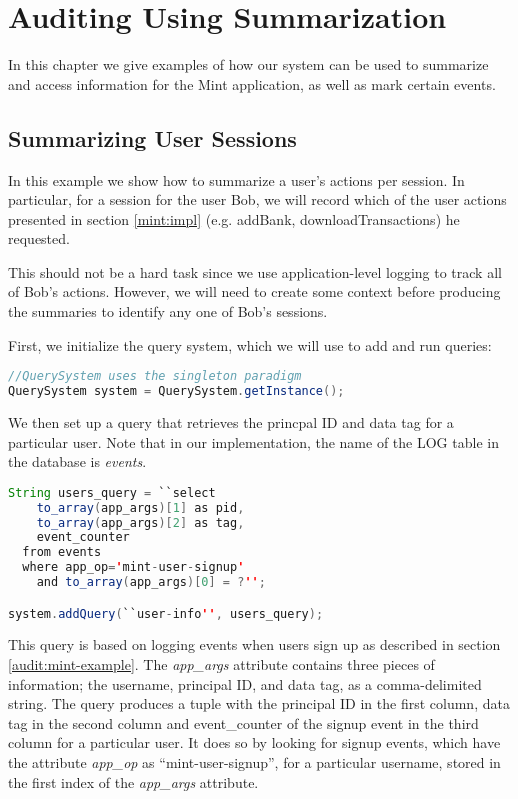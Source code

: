 \chapter{Auditing Using Summarization}

In this chapter we give examples of how our system can be used to summarize and access information for the Mint application, as well as mark certain events.

\section{Summarizing User Sessions}
\label{sum:sessions}
In this example we show how to summarize a user's actions per session. In particular, for a session for the user Bob, we will record which of the user actions presented in section \ref{mint:impl} (e.g. addBank, downloadTransactions) he requested.

This should not be a hard task since we use application-level logging to track all of Bob's actions. However, we will need to create some context before producing the summaries to identify any one of Bob's sessions.

First, we initialize the query system, which we will use to add and run queries:

\begin{lstlisting}[language=Java]
//QuerySystem uses the singleton paradigm
QuerySystem system = QuerySystem.getInstance();
\end{lstlisting}

We then set up a query that retrieves the princpal ID and data tag for a particular user. Note that in our implementation, the name of the LOG table in the database is \emph{events}.

\begin{lstlisting}[language=Java]
String users_query = ``select 
    to_array(app_args)[1] as pid, 
    to_array(app_args)[2] as tag, 
    event_counter 
  from events 
  where app_op='mint-user-signup' 
    and to_array(app_args)[0] = ?'';

system.addQuery(``user-info'', users_query);
\end{lstlisting}

\noindent
This query is based on logging events when users sign up as described in section \ref{audit:mint-example}. The \emph{app\_args} attribute contains three pieces of information; the username, principal ID, and data tag, as a comma-delimited string. The query produces a tuple with the principal ID in the first column, data tag in the second column and event\_counter of the signup event in the third column for a particular user. It does so by looking for signup events, which have the attribute \emph{app\_op} as ``mint-user-signup'', for a particular username, stored in the first index of the \emph{app\_args} attribute. 

